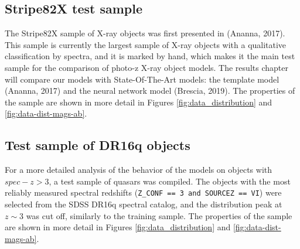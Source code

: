 \documentclass[fleqn,usenatbib]{mnras}
\begin{document}
\subsection{Stripe82X test sample}
The Stripe82X sample of X-ray objects was first presented in (Ananna, 2017). This sample is currently the largest sample of X-ray objects with a qualitative classification by spectra, and it is marked by hand, which makes it the main test sample for the comparison of photo-z X-ray object models. The results chapter will compare our models with State-Of-The-Art models: the template model (Ananna, 2017) and the neural network model (Brescia, 2019). The properties of the sample are shown in more detail in Figures \ref{fig:data_distribution} and \ref{fig:data-dist-mags-ab}.

\subsection{Test sample of DR16q objects}
For a more detailed analysis of the behavior of the models on objects with $spec-z > 3$, a test sample of quasars was compiled. The objects with the most reliably measured spectral redshifts (\texttt{Z\_CONF == 3 and SOURCEZ == VI}) were selected from the SDSS DR16q spectral catalog, and the distribution peak at $z \sim 3$ was cut off, similarly to the training sample. The properties of the sample are shown in more detail in Figures \ref{fig:data_distribution} and \ref{fig:data-dist-mags-ab}.
\end{document}
